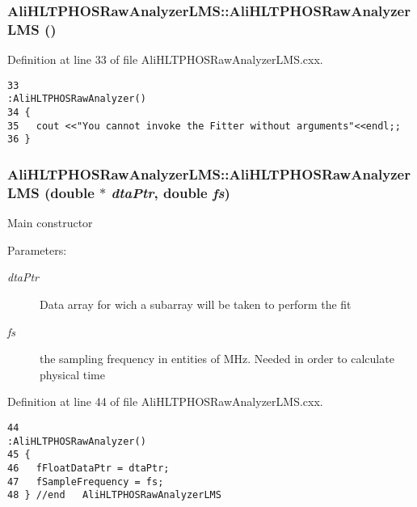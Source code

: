 \subsubsection{\setlength{\rightskip}{0pt plus 5cm}Ali\-HLTPHOSRaw\-Analyzer\-LMS::Ali\-HLTPHOSRaw\-Analyzer\-LMS ()}\label{classAliHLTPHOSRawAnalyzerLMS_a0}




Definition at line 33 of file Ali\-HLTPHOSRaw\-Analyzer\-LMS.cxx.

\footnotesize\begin{verbatim}33                                                   :AliHLTPHOSRawAnalyzer() 
34 {
35   cout <<"You cannot invoke the Fitter without arguments"<<endl;;
36 }
\end{verbatim}\normalsize 


\subsubsection{\setlength{\rightskip}{0pt plus 5cm}Ali\-HLTPHOSRaw\-Analyzer\-LMS::Ali\-HLTPHOSRaw\-Analyzer\-LMS (double $\ast$ {\em dta\-Ptr}, double {\em fs})}\label{classAliHLTPHOSRawAnalyzerLMS_a1}


Main constructor \begin{Desc}
\item[Parameters:]
\begin{description}
\item[{\em dta\-Ptr}]Data array for wich a subarray will be taken to perform the fit \item[{\em fs}]the sampling frequency in entities of MHz. Needed in order to calculate physical time \end{description}
\end{Desc}


Definition at line 44 of file Ali\-HLTPHOSRaw\-Analyzer\-LMS.cxx.

\footnotesize\begin{verbatim}44                                                                            :AliHLTPHOSRawAnalyzer() 
45 {
46   fFloatDataPtr = dtaPtr;  
47   fSampleFrequency = fs;
48 } //end   AliHLTPHOSRawAnalyzerLMS 
\end{verbatim}\normalsize 


